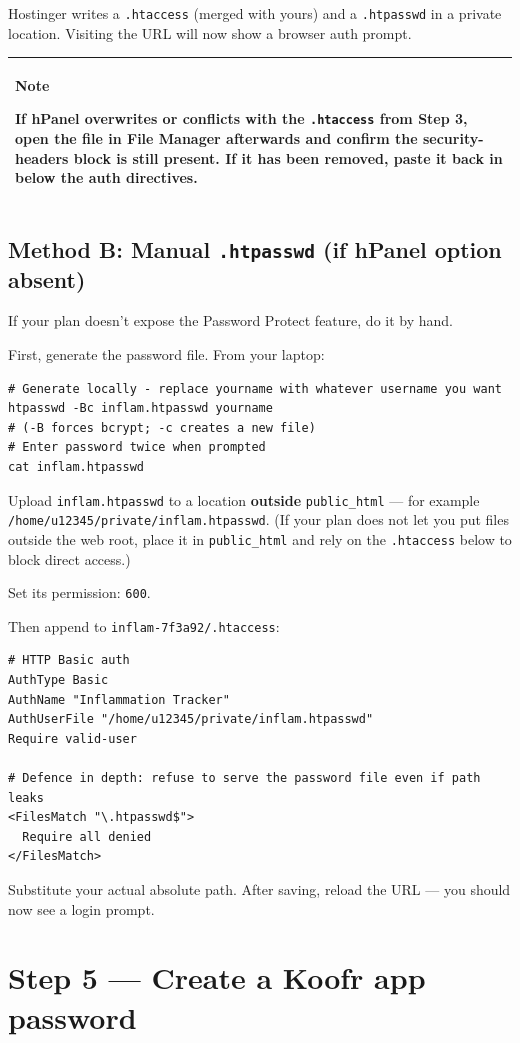 \documentclass[11pt,a4paper]{article}
\newcommand{\callout}[3]{%
  \begin{center}%
  \begin{tabularx}{\linewidth}{|>{\columncolor{#1}}X|}%
  \hline
  \textbf{#2}\par\smallskip #3\\[2pt]
  \hline
  \end{tabularx}%
  \end{center}%
}
\newcommand{\notebox}[1]{\callout{notebg}{Note}{#1}}
\begin{document}
Hostinger writes a \texttt{.htaccess} (merged with yours) and a \texttt{.htpasswd} in a private location. Visiting the URL will now show a browser auth prompt.

\notebox{If hPanel overwrites or conflicts with the \texttt{.htaccess} from Step 3, open the file in File Manager afterwards and confirm the security-headers block is still present. If it has been removed, paste it back in below the auth directives.}

\subsection{Method B: Manual \texttt{.htpasswd} (if hPanel option absent)}

If your plan doesn't expose the Password Protect feature, do it by hand.

First, generate the password file. From your laptop:

\begin{lstlisting}[language=shell]
# Generate locally - replace yourname with whatever username you want
htpasswd -Bc inflam.htpasswd yourname
# (-B forces bcrypt; -c creates a new file)
# Enter password twice when prompted
cat inflam.htpasswd
\end{lstlisting}

Upload \texttt{inflam.htpasswd} to a location \textbf{outside} \texttt{public\_html} --- for example \texttt{/home/u12345/private/inflam.htpasswd}. (If your plan does not let you put files outside the web root, place it in \texttt{public\_html} and rely on the \texttt{.htaccess} below to block direct access.)

Set its permission: \texttt{600}.

Then append to \texttt{inflam-7f3a92/.htaccess}:

\begin{lstlisting}[language=htaccess]
# HTTP Basic auth
AuthType Basic
AuthName "Inflammation Tracker"
AuthUserFile "/home/u12345/private/inflam.htpasswd"
Require valid-user

# Defence in depth: refuse to serve the password file even if path leaks
<FilesMatch "\.htpasswd$">
  Require all denied
</FilesMatch>
\end{lstlisting}

Substitute your actual absolute path. After saving, reload the URL --- you should now see a login prompt.

\section{Step 5 --- Create a Koofr app password}
\end{document}
